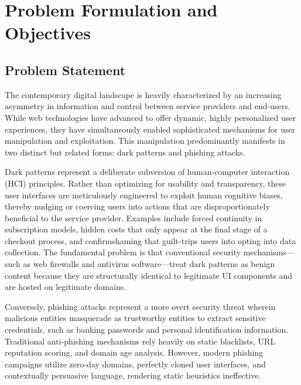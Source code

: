 
\chapter{Problem Formulation and Objectives}

\section{Problem Statement}

The contemporary digital landscape is heavily characterized by an increasing asymmetry in information and control between service providers and end-users. While web technologies have advanced to offer dynamic, highly personalized user experiences, they have simultaneously enabled sophisticated mechanisms for user manipulation and exploitation. This manipulation predominantly manifests in two distinct but related forms: dark patterns and phishing attacks. 

Dark patterns represent a deliberate subversion of human-computer interaction (HCI) principles. Rather than optimizing for usability and transparency, these user interfaces are meticulously engineered to exploit human cognitive biases, thereby nudging or coercing users into actions that are disproportionately beneficial to the service provider. Examples include forced continuity in subscription models, hidden costs that only appear at the final stage of a checkout process, and confirmshaming that guilt-trips users into opting into data collection. The fundamental problem is that conventional security mechanisms—such as web firewalls and antivirus software—treat dark patterns as benign content because they are structurally identical to legitimate UI components and are hosted on legitimate domains.

Conversely, phishing attacks represent a more overt security threat wherein malicious entities masquerade as trustworthy entities to extract sensitive credentials, such as banking passwords and personal identification information. Traditional anti-phishing mechanisms rely heavily on static blacklists, URL reputation scoring, and domain age analysis. However, modern phishing campaigns utilize zero-day domains, perfectly cloned user interfaces, and contextually persuasive language, rendering static heuristics ineffective.

